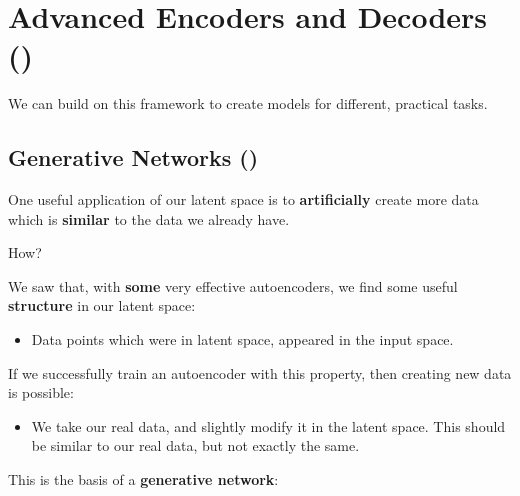         
\pagebreak

\section{Advanced Encoders and Decoders ()}

    We can build on this framework to create models for different, practical tasks.

    \subsection{Generative Networks ()}

        One useful application of our latent space is to \textbf{artificially} create more data which is \textbf{similar} to the data we already have.

        How?

        We saw that, with \textbf{some} very effective autoencoders, we find some useful \textbf{structure} in our latent space:

        \begin{itemize}
            \item Data points which were  in latent space, appeared  in the input space.
        \end{itemize}
        
        If we successfully train an autoencoder with this property, then creating new data is possible:

        \begin{itemize}
            \item We take our real data, and slightly modify it in the latent space. This should be similar to our real data, but not exactly the same.
        \end{itemize}
        
        This is the basis of a \textbf{generative network}:\\


